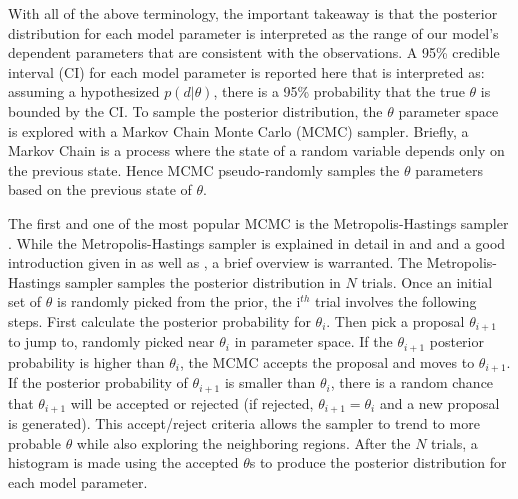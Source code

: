 \documentclass[draft]{agujournal2019}
\begin{document}
With all of the above terminology, the important takeaway is that the posterior distribution for each model parameter is interpreted as the range of our model's dependent parameters that are consistent with the observations. A 95\% credible interval (CI) for each model parameter is reported here that is interpreted as: assuming a hypothesized $p(d | \theta)$, there is a 95\% probability that the true $\theta$ is bounded by the CI. To sample the posterior distribution, the $\theta$ parameter space is explored with a Markov Chain Monte Carlo (MCMC) sampler. Briefly, a Markov Chain is a process where the state of a random variable depends only on the previous state. Hence MCMC pseudo-randomly samples the $\theta$ parameters based on the previous state of $\theta$. 

The first and one of the most popular MCMC is the Metropolis-Hastings sampler \cite{Metropolis1953, Hastings1970}. While the Metropolis-Hastings sampler is explained in detail in  and  and a good introduction given in  as well as , a brief overview is warranted. The Metropolis-Hastings sampler samples the posterior distribution in $N$ trials. Once an initial set of $\theta$ is randomly picked from the prior, the i$^{th}$ trial involves the following steps. First calculate the posterior probability for $\theta_i$. Then pick a proposal $\theta_{i+1}$ to jump to, randomly picked near $\theta_i$ in parameter space. If the $\theta_{i+1}$ posterior probability is higher than $\theta_i$, the MCMC accepts the proposal and moves to $\theta_{i+1}$. If the posterior probability of $\theta_{i+1}$ is smaller than $\theta_{i}$, there is a random chance that $\theta_{i+1}$ will be accepted or rejected (if rejected, $\theta_{i+1} = \theta_i$ and a new proposal is generated). This accept/reject criteria allows the sampler to trend to more probable $\theta$ while also exploring the neighboring regions. After the $N$ trials, a histogram is made using the accepted $\theta$s to produce the posterior distribution for each model parameter.
\end{document}
